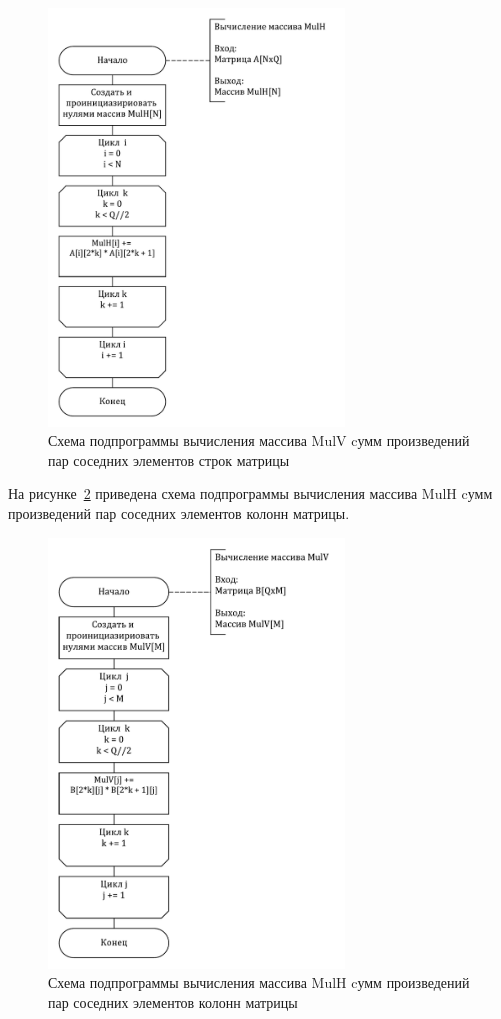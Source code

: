 \begin{figure}[H]
	\centering
	\includegraphics[width=0.7\textwidth]{images/MulH.pdf}
	\caption{Схема подпрограммы вычисления массива MulV cумм произведений пар соседних элементов строк матрицы}
	\label{img:MulH}
\end{figure}
\clearpage

На рисунке~\ref{img:MulV} приведена схема подпрограммы вычисления массива MulH cумм произведений пар соседних элементов колонн матрицы.

\begin{figure}[H]
	\centering
	\includegraphics[width=0.7\textwidth]{images/MulV.pdf}
	\caption{Схема подпрограммы вычисления массива MulH cумм произведений пар соседних элементов колонн матрицы}
	\label{img:MulV}
\end{figure}
\clearpage

